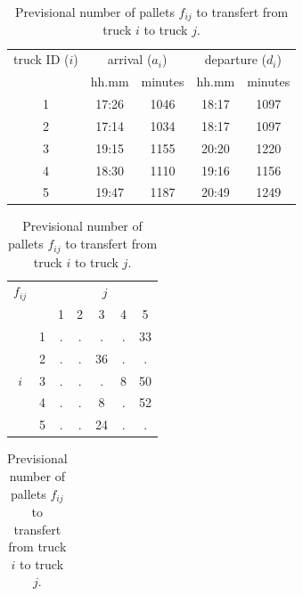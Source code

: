 \documentclass[preprint,12pt,authoryear]{elsarticle}
\begin{document}
\begin{table}[h]
    \centering
    
    \begin{subtable}{0.90\linewidth}
        \centering
           \begin{tabular}{| c || c | c | c | c |}
           \hline
           truck ID ($i$) & \multicolumn{2}{c|}{arrival ($a_i$)} & \multicolumn{2}{c|}{departure ($d_i$)} \\
            \cline{2-5}
           & hh.mm & minutes &   hh.mm & minutes  \\
           \hline
                 1  & 17:26 & 1046  &  18:17 & 1097\\
                 2  & 17:14 & 1034 & 18:17 &  1097 \\
                 3  & 19:15 & 1155  & 20:20 &  1220 \\
                 4  & 18:30 & 1110  & 19:16 &  1156 \\
                 5  & 19:47 & 1187  & 20:49 &  1249\\
                 \hline
           \end{tabular}
           \caption{Previsional planning  of trucks.}
           \label{tab:didacPlanningArrDepTrucks}
    \end{subtable}%
    \vspace{3mm}
    
    \begin{subtable}{0.45\linewidth}
        \centering
            \begin{tabular}{c c|c c c c c|}

            $f_{ij}$       &      & \multicolumn{5}{c|}{$j$} \\
            &     & 1 & 2 & 3 & 4 & 5 \\
            \hline
            &  1 & . &   . &   . &   . &  33 \\
            &  2 & . &   . &  36 &   . &   . \\
            $i$ &  3 & . &   . &   .  &  8 &  50 \\
            &  4 & . &   . &   8  &  . &  52 \\
            &  5 & . &   . &  24 &   . &   . \\
            \hline        
            \end{tabular}
            \caption{Previsional number of pallets  $f_{ij}$ to transfert from truck $i$ to truck $j$.}
            \label{tab:didacPrePalettes}
    \end{subtable}
    \hfill
    \begin{subtable}{0.45\linewidth}
        \centering
            \begin{tabular}{c c|c c c c c|}


\end{tabular}
\end{subtable}
\end{table}
\end{document}
